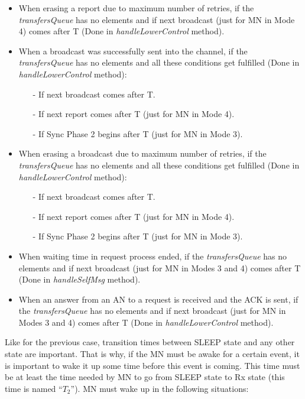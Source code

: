 \begin{itemize}
  \item When erasing a report due to maximum number of retries, if the \textit{transfersQueue} has no elements and if next broadcast (just for 
  \ac{MN} in Mode 4) comes after T (Done in \textit{handleLowerControl} method).

  \item When a broadcast was successfully sent into the channel, if the \textit{transfersQueue} has no elements and all these conditions get 
  fulfilled (Done in \textit{handleLowerControl} method):
    \begin{itemize}
      \item[-] If next broadcast comes after T.
      \item[-] If next report comes after T (just for \ac{MN} in Mode 4).
      \item[-] If Sync Phase 2 begins after T (just for \ac{MN} in Mode 3).
    \end{itemize}

  \item When erasing a broadcast due to maximum number of retries, if the \textit{transfersQueue} has no elements and all these conditions get
  fulfilled (Done in \textit{handleLowerControl} method):
    \begin{itemize}
      \item[-] If next broadcast comes after T.
      \item[-] If next report comes after T (just for \ac{MN} in Mode 4).
      \item[-] If Sync Phase 2 begins after T (just for \ac{MN} in Mode 3).
    \end{itemize}

  \item When waiting time in request process ended, if the \textit{transfersQueue} has no elements and if next broadcast (just for \ac{MN} in 
  Modes 3 and 4) comes after T (Done in \textit{handleSelfMsg} method).

  \item When an answer from an \ac{AN} to a request is received and the \ac{ACK} is sent, if the \textit{transfersQueue} has no elements and 
  if next broadcast (just for \ac{MN} in Modes 3 and 4) comes after T (Done in \textit{handleLowerControl} method).

\end{itemize}

Like for the previous case, transition times between SLEEP state and any other state are important. That is why, if the \ac{MN} must be awake for 
a certain event, it is important to wake it up some time before this event is coming. This time must be at least the time needed by \ac{MN} to go 
from SLEEP state to \ac{Rx} state (this time is named ``$T_2$''). \ac{MN} must wake up in the following situations:

